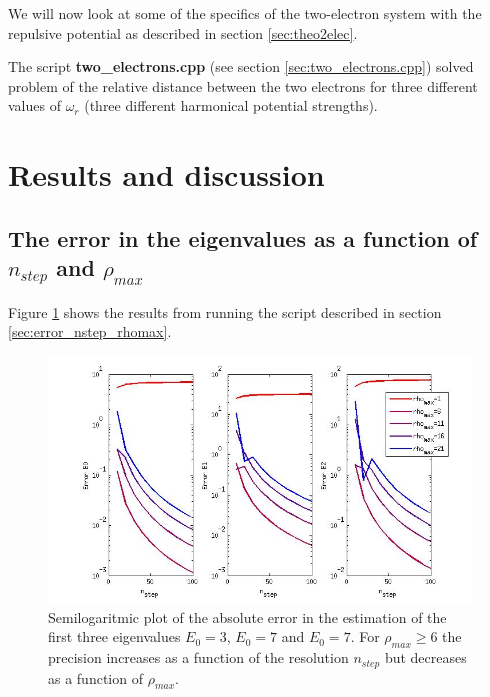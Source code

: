 \documentclass[a4paper,10pt,english]{article}
\numberwithin{figure}{subsection}
\numberwithin{table}{subsection}
\numberwithin{equation}{subsection}
\begin{document}
We will now look at some of the specifics of the two-electron system with 
the repulsive potential as described in section \ref{sec:theo2elec}. 

The script \textbf{two\_electrons.cpp} (see section \ref{sec:two_electrons.cpp})
solved problem of the relative distance between the two electrons 
for three different values of $\omega_r$ 
(three different harmonical potential strengths). 





























\newpage
\section{Results and discussion}

\subsection{The error in the eigenvalues as a function of $n_{step}$ and $\rho_{max}$}
Figure \ref{fig:error_nstep_rhomax} shows the results from running the script 
described in section \ref{sec:error_nstep_rhomax}.

\begin{figure}[h!]
  \centering
  \includegraphics[width=\textwidth]{error_nstep_rhomax.jpg}
  \caption{Semilogaritmic plot of the absolute error in the 
    estimation of the first three eigenvalues $E_0 = 3$, $E_0 = 7$ and $E_0 = 7$. 
    For $\rho_{max} \geq 6$ the precision increases as a function of the resolution 
    $n_{step}$ but decreases as a function of $\rho_{max}$.}
  \label{fig:error_nstep_rhomax}
\end{figure}
\end{document}
